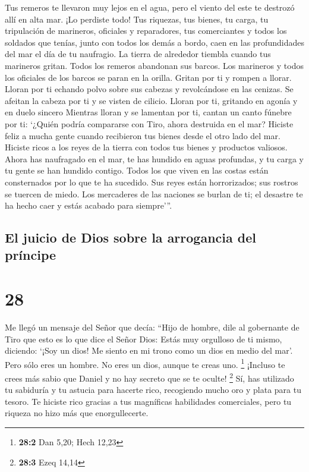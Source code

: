  Tus remeros te llevaron muy lejos en el agua, pero el
viento del este te destrozó allí en alta mar.  ¡Lo
perdiste todo! Tus riquezas, tus bienes, tu carga, tu tripulación de
marineros, oficiales y reparadores, tus comerciantes y todos los
soldados que tenías, junto con todos los demás a bordo, caen en las
profundidades del mar el día de tu naufragio.  La tierra
de alrededor tiembla cuando tus marineros gritan.  Todos
los remeros abandonan sus barcos. Los marineros y todos los oficiales de
los barcos se paran en la orilla.  Gritan por ti y rompen
a llorar. Lloran por ti echando polvo sobre sus cabezas y revolcándose
en las cenizas.  Se afeitan la cabeza por ti y se visten
de cilicio. Lloran por ti, gritando en agonía y en duelo sincero
 Mientras lloran y se lamentan por ti, cantan un canto
fúnebre por ti: `¿Quién podría compararse con Tiro, ahora destruida en
el mar?  Hiciste feliz a mucha gente cuando recibieron
tus bienes desde el otro lado del mar. Hiciste ricos a los reyes de la
tierra con todos tus bienes y productos valiosos.  Ahora
has naufragado en el mar, te has hundido en aguas profundas, y tu carga
y tu gente se han hundido contigo.  Todos los que viven
en las costas están consternados por lo que te ha sucedido. Sus reyes
están horrorizados; sus rostros se tuercen de miedo.  Los
mercaderes de las naciones se burlan de ti; el desastre te ha hecho caer
y estás acabado para siempre'''.

\hypertarget{el-juicio-de-dios-sobre-la-arrogancia-del-pruxedncipe}{%
\subsection{El juicio de Dios sobre la arrogancia del
príncipe}\label{el-juicio-de-dios-sobre-la-arrogancia-del-pruxedncipe}}

\hypertarget{section-27}{%
\section{28}\label{section-27}}

 Me llegó un mensaje del Señor que decía: 
``Hijo de hombre, dile al gobernante de Tiro que esto es lo que dice el
Señor Dios: Estás muy orgulloso de ti mismo, diciendo: `¡Soy un dios! Me
siento en mi trono como un dios en medio del mar'. Pero sólo eres un
hombre. No eres un dios, aunque te creas uno. \footnote{\textbf{28:2}
  Dan 5,20; Hech 12,23}  ¡Incluso te crees más sabio que
Daniel y no hay secreto que se te oculte! \footnote{\textbf{28:3} Ezeq
  14,14}  Sí, has utilizado tu sabiduría y tu astucia para
hacerte rico, recogiendo mucho oro y plata para tu tesoro.
 Te hiciste rico gracias a tus magníficas habilidades
comerciales, pero tu riqueza no hizo más que enorgullecerte.

